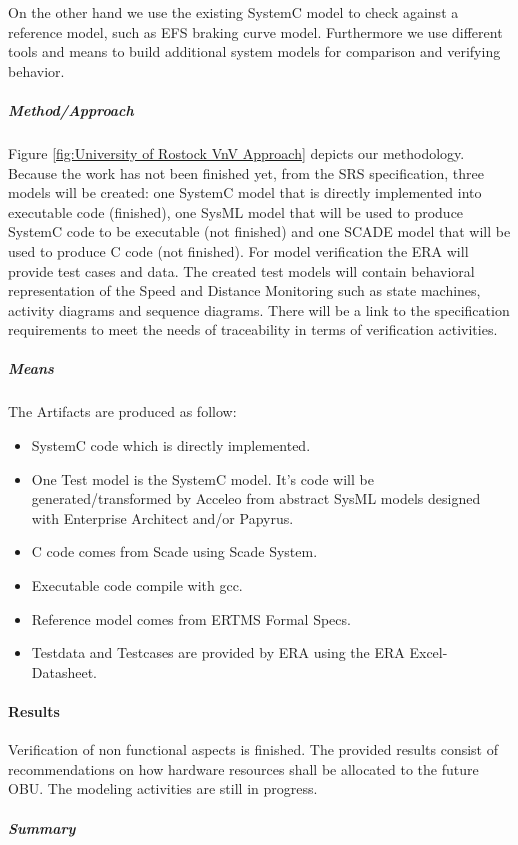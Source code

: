 \documentclass{article}
\begin{document}
On the other hand we use the existing SystemC model to check against a reference model, such as EFS braking curve model. Furthermore we use different tools and means to build additional system models for comparison and verifying behavior.

\subparagraph{Method/Approach}

Figure \ref{fig:University of Rostock VnV Approach} depicts our methodology. Because the work has not been finished yet, from the SRS
specification, three models will be created: one SystemC model that is directly implemented into executable code (finished), one SysML model that will be used to produce SystemC code to be executable (not finished) and one SCADE model that will be used to produce C code (not finished). For model verification the ERA will provide test cases and data. The created test models will contain behavioral representation of the Speed and Distance Monitoring such as state machines, activity diagrams and sequence diagrams. There will be a link to the specification requirements to meet the needs of traceability in terms of verification activities.


\subparagraph{Means}

The Artifacts are produced as follow:
\begin{itemize}
\item SystemC code which is directly implemented.
\item One Test model is the SystemC model. It's code will be generated/transformed by Acceleo from abstract SysML models designed with Enterprise Architect and/or Papyrus.
\item C code comes from Scade using Scade System.
\item Executable code compile with gcc.
\item Reference model comes from ERTMS Formal Specs.
\item Testdata and Testcases are provided by ERA using the ERA Excel-Datasheet.
\end{itemize}

\paragraph{Results}

Verification of non functional aspects is finished. The provided results consist of recommendations on how hardware resources shall be allocated to the future OBU. The modeling activities are still in progress.

\subparagraph{Summary}
\end{document}
